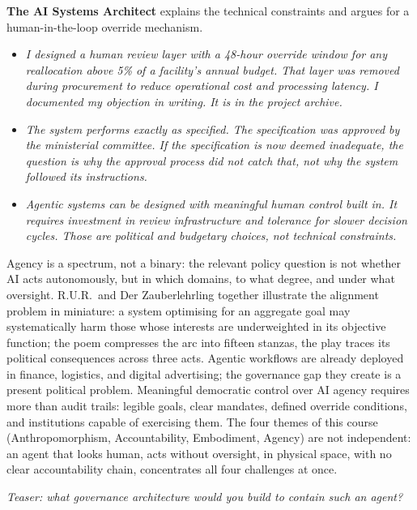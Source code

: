 \medskip
\noindent\textbf{The AI Systems Architect} explains the technical constraints and
    argues for a human-in-the-loop override mechanism.
    \begin{itemize}
        \item \textit{I designed a human review layer with a 48-hour
        override window for any reallocation above 5\% of a facility's
        annual budget. That layer was removed during procurement to reduce
        operational cost and processing latency. I documented my objection
        in writing. It is in the project archive.}
        \item \textit{The system performs exactly as specified. The
        specification was approved by the ministerial committee. If the
        specification is now deemed inadequate, the question is why the
        approval process did not catch that, not why the system followed
        its instructions.}
        \item \textit{Agentic systems can be designed with meaningful human
        control built in. It requires investment in review infrastructure
        and tolerance for slower decision cycles. Those are political and
        budgetary choices, not technical constraints.}
    \end{itemize}


Agency is a spectrum, not a binary: the relevant policy question is not whether AI acts autonomously,
but in which domains, to what degree, and under what oversight. R.U.R.\ and Der Zauberlehrling
together illustrate the alignment problem in miniature: a system optimising for an aggregate goal
may systematically harm those whose interests are underweighted in its objective function; the poem
compresses the arc into fifteen stanzas, the play traces its political consequences across three acts.
Agentic workflows are already deployed in finance, logistics, and digital advertising; the governance
gap they create is a present political problem. Meaningful democratic control over AI agency requires
more than audit trails: legible goals, clear mandates, defined override conditions, and institutions
capable of exercising them. The four themes of this course (Anthropomorphism, Accountability,
Embodiment, Agency) are not independent: an agent that looks human, acts without oversight,
in physical space, with no clear accountability chain, concentrates all four challenges at once.

\medskip
\noindent\textit{Teaser: what governance architecture would you build
to contain such an agent?}
